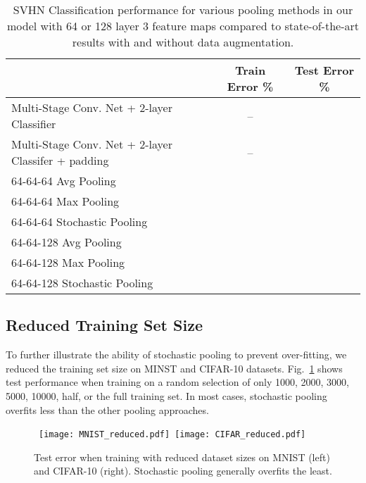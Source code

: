 \documentclass{article} \usepackage{nips12submit_e,times}
\newcommand{\fig}[1]{Fig.~\ref{fig:#1}}
\begin{document}
\begin{table}[h!]
\small
\vspace*{-2mm}
\begin{center}
\begin{tabular}{|l|c|c|}
  \hline
  & Train Error \% & Test Error \% \\
  \hline Multi-Stage Conv. Net + 2-layer Classifier  \cite{Sermanet11} & -- &  \\
  \hline Multi-Stage Conv. Net + 2-layer Classifer + padding \cite{Sermanet11} & -- &  \\
  \hline \hline   64-64-64 Avg Pooling  &  &  \\
  \hline 64-64-64 Max Pooling  &  &  \\
  \hline 64-64-64 Stochastic Pooling  &  &  \\ \hline \hline   64-64-128 Avg Pooling  &  &  \\
  \hline 64-64-128 Max Pooling  &  &  \\
  \hline 64-64-128 Stochastic Pooling  &  &  \\ \hline
\end{tabular}
\vspace*{-2mm}
\caption{SVHN Classification performance for various pooling methods in
  our model with 64 or 128 layer 3 feature maps compared to state-of-the-art results with and
  without data augmentation.}
\label{tab:svhn}
\vspace*{-6mm}
\end{center}
\end{table}


\subsection{Reduced Training Set Size}
\vspace{-1mm}
To further illustrate the ability of stochastic pooling to prevent
over-fitting, we reduced the training set size on MINST and CIFAR-10
datasets. \fig{reduced} shows test performance when training on a
random selection of only 1000, 2000, 3000, 5000, 10000, half, or the
full training set. In most cases, stochastic pooling overfits less than the other pooling
approaches.

\begin{figure}[h!]
\vspace*{-0.4cm}
\begin{center}
\mbox{
\texttt{[image: MNIST\_reduced.pdf]}
\texttt{[image: CIFAR\_reduced.pdf]}}
\end{center}
\vspace*{-0.6cm}
\caption{Test error when training with reduced dataset sizes on MNIST (left) and
  CIFAR-10 (right). Stochastic pooling generally overfits the least. }
\label{fig:reduced}
\vspace*{-0.4cm}
\end{figure}
\end{document}
